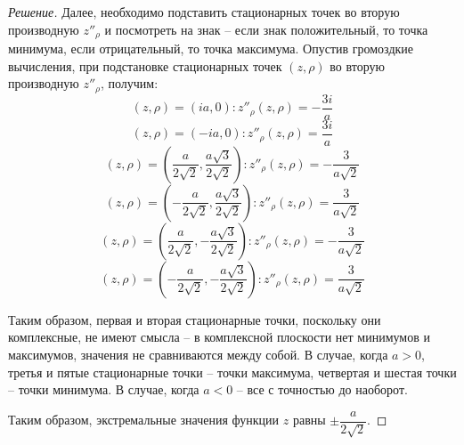 \documentclass{article}
\begin{document}
\begin{proof}[Решение]
Далее, необходимо подставить стационарных точек во вторую производную $z''_\rho$ и посмотреть на знак -- если знак положительный, то точка минимума, если отрицательный, то точка максимума. Опустив громоздкие вычисления, при подстановке стационарных точек $(z, \rho)$ во вторую производную $z''_\rho$, получим:
$$(z, \rho) = (ia, 0): z''_\rho(z, \rho)= -\frac{3i}{a}$$
$$(z, \rho) = (-ia, 0): z''_\rho(z, \rho) = \frac{3i}{a}$$
$$(z, \rho) = \left(\frac{a}{2\sqrt{2}}, \frac{a\sqrt{3}}{2\sqrt{2}} \right): z''_\rho(z, \rho) = -\frac{3}{a\sqrt{2}}$$
$$(z, \rho) = \left(-\frac{a}{2\sqrt{2}}, \frac{a\sqrt{3}}{2\sqrt{2}} \right): z''_\rho(z, \rho) = \frac{3}{a\sqrt{2}}$$
$$(z, \rho) = \left(\frac{a}{2\sqrt{2}}, -\frac{a\sqrt{3}}{2\sqrt{2}} \right): z''_\rho(z, \rho) = -\frac{3}{a\sqrt{2}}$$
$$(z, \rho) = \left(-\frac{a}{2\sqrt{2}}, -\frac{a\sqrt{3}}{2\sqrt{2}} \right): z''_\rho(z, \rho) = \frac{3}{a\sqrt{2}}$$
	
Таким образом, первая и вторая стационарные точки, поскольку они комплексные, не имеют смысла -- в комплексной плоскости нет минимумов и максимумов, значения не сравниваются между собой. 
В случае, когда $a>0$, третья и пятые стационарные точки -- точки максимума, четвертая и шестая точки -- точки минимума. В случае, когда $a<0$ -- все с точностью до наоборот.

Таким образом, экстремальные значения функции $z$ равны $\pm \dfrac{a}{2\sqrt{2}}$.
	
	
	
	\end{proof}
	
\end{document}
